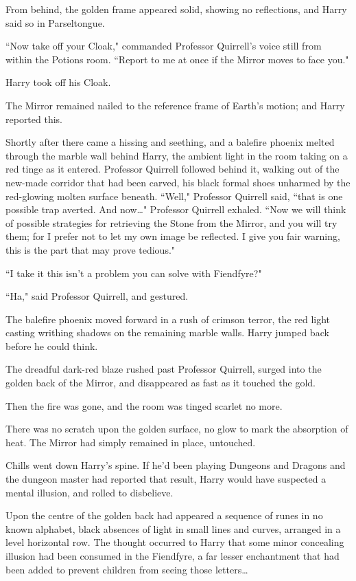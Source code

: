 From behind, the golden frame appeared solid, showing no reflections, and Harry said so in Parseltongue.

``Now take off your Cloak," commanded Professor Quirrell's voice still from within the Potions room. ``Report to me at once if the Mirror moves to face you."

Harry took off his Cloak.

The Mirror remained nailed to the reference frame of Earth's motion; and Harry reported this.

Shortly after there came a hissing and seething, and a balefire phoenix melted through the marble wall behind Harry, the ambient light in the room taking on a red tinge as it entered. Professor Quirrell followed behind it, walking out of the new-made corridor that had been carved, his black formal shoes unharmed by the red-glowing molten surface beneath. ``Well," Professor Quirrell said, ``that is one possible trap averted. And now{\ldots}" Professor Quirrell exhaled. ``Now we will think of possible strategies for retrieving the Stone from the Mirror, and you will try them; for I prefer not to let my own image be reflected. I give you fair warning, this is the part that may prove tedious."

``I take it this isn't a problem you can solve with Fiendfyre?"

``Ha," said Professor Quirrell, and gestured.

The balefire phoenix moved forward in a rush of crimson terror, the red light casting writhing shadows on the remaining marble walls. Harry jumped back before he could think.

The dreadful dark-red blaze rushed past Professor Quirrell, surged into the golden back of the Mirror, and disappeared as fast as it touched the gold.

Then the fire was gone, and the room was tinged scarlet no more.

There was no scratch upon the golden surface, no glow to mark the absorption of heat. The Mirror had simply remained in place, untouched.

Chills went down Harry's spine. If he'd been playing Dungeons and Dragons and the dungeon master had reported that result, Harry would have suspected a mental illusion, and rolled to disbelieve.

Upon the centre of the golden back had appeared a sequence of runes in no known alphabet, black absences of light in small lines and curves, arranged in a level horizontal row. The thought occurred to Harry that some minor concealing illusion had been consumed in the Fiendfyre, a far lesser enchantment that had been added to prevent children from seeing those letters{\ldots}

